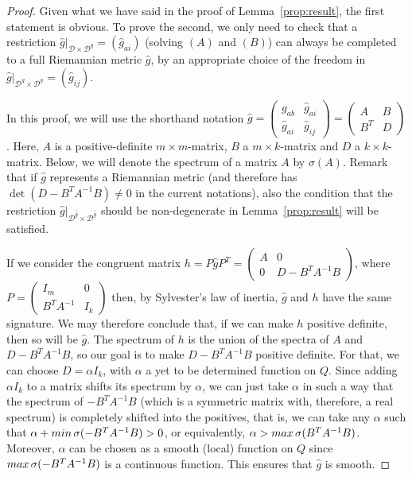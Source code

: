 \documentclass[11pt]{article}
\def\D{{\mathcal D}}
\begin{document}
\begin{proof} Given what we have said in the proof of  Lemma~\ref{prop:result}, the first statement is obvious. To prove the second, we only need  to check that a restriction $\hat{g}|_{\D \times \D^g} = ({\hat g}_{ai})$ (solving $(A)$ and $(B)$) can always be completed to a full Riemannian metric $\hat g$, by an appropriate choice of the freedom in $\hat{g}|_{\D^g \times \D^g} = ({\hat g}_{ij})$. 

In this proof, we will use the shorthand notation $\hat{g}=\begin{pmatrix}
 {g}_{ab}& \hat{g}_{ai}\\\hat{g}_{ai}&\hat{g}_{ij}     
\end{pmatrix}=\begin{pmatrix}
    A&B\\B^T&D
\end{pmatrix}$.
Here, $A$ is a positive-definite $m\times m$-matrix, $B$ a $m\times k$-matrix and $D$ a $k\times k$-matrix. Below, we will  denote the spectrum of a matrix $A$ by $\sigma(A)$. Remark that if $\hat g$ represents a Riemannian metric (and therefore has $\det(D-B^T A^{-1}B)\neq 0$ in the current notations), also the condition that the restriction ${\hat g}|_{\D^{\hat g} \times \D^{\hat g}}$ should be non-degenerate in Lemma~\ref{prop:result} will be satisfied.

 If we consider the congruent  matrix $h=P{\hat g}P^T=\begin{pmatrix}
    A&0\\0&D-B^TA^{-1}B
\end{pmatrix}$, where $P= \begin{pmatrix}
    I_m&0\\B^TA^{-1}&I_k
\end{pmatrix}$
then,  by Sylvester's law of inertia, ${\hat g}$ and $h$ have the same signature. We may therefore conclude that, if we can make
$h$ positive definite, then so will be $\hat g$. The spectrum of $h$ is the union of the spectra of $A$
and $D - B^T A^{-1} B$, so our goal is to make $D - B^T A^{-1} B$ positive definite.  For that, we can choose $D=\alpha I_k$, with 
 $\alpha$ a yet to be determined function on $Q$. Since adding $\alpha I_k$ to a matrix shifts its spectrum
by $\alpha$, we can just take $\alpha$ in such a way that the spectrum of $-B^T A^{-1} B$ (which is a symmetric matrix with, therefore, a real spectrum)  is completely shifted into the
positives, that is, we can take any $\alpha$ such that $\alpha + {\rm min\,} \sigma(-B^T A^{-1} B) > 0$, or equivalently, $\alpha   > {\rm max\,}\sigma  (B^T A^{-1}B)$. Moreover, $\alpha$ can be chosen as a smooth (local) function on $Q$ since ${\rm max\,} \sigma (-B^T A^{-1} B)$ is a
continuous function. This ensures that $\hat g$ is smooth. 
\end{proof}
\end{document}
